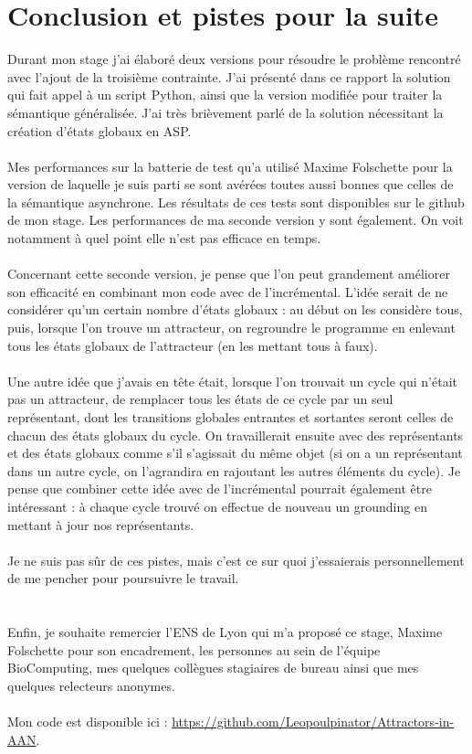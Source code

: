 \documentclass[10pt,a4paper]{article}
\begin{document}
\section{Conclusion et pistes pour la suite}
Durant mon stage j'ai élaboré deux versions pour résoudre le problème rencontré avec l'ajout de la troisième contrainte. J'ai présenté dans ce rapport la solution qui fait appel à un script Python, ainsi que la version modifiée 
pour traiter la sémantique généralisée. J'ai très brièvement parlé de la solution nécessitant la création d'états globaux en ASP.\\ \\
Mes performances sur la batterie de test qu'a utilisé Maxime Folschette pour la version de laquelle je suis parti se sont avérées toutes aussi bonnes que celles de la sémantique asynchrone. Les résultats de ces tests sont 
disponibles sur le github de mon stage. Les performances de ma seconde version y sont également. On voit notamment à quel point 
elle n'est pas efficace en temps.\\ \\
Concernant cette seconde version, je pense que l'on peut grandement améliorer son efficacité en combinant mon code avec de l'incrémental. L'idée serait de ne considérer qu'un certain nombre d'états globaux : au début on les 
considère tous, puis, lorsque l'on trouve un attracteur, on regroundre le programme en enlevant tous les états globaux de l'attracteur (en les mettant tous à faux).\\ \\
Une autre idée que j'avais en tête était, lorsque l'on trouvait un cycle qui n'était pas un attracteur, de remplacer tous les états de ce cycle par un seul représentant, dont les transitions globales entrantes et sortantes 
seront celles de chacun des états globaux du cycle. On travaillerait ensuite avec des représentants et des états globaux comme s'il s'agissait du même objet (si on a un représentant dans un autre cycle, on l'agrandira en rajoutant 
les autres éléments du cycle). Je pense que combiner cette idée avec de l'incrémental pourrait également être intéressant : à chaque cycle trouvé on effectue de nouveau un grounding en mettant à jour nos représentants.\\ \\
Je ne suis pas sûr de ces pistes, mais c'est ce sur quoi j'essaierais personnellement de me pencher pour poursuivre le travail.\\ \\ \\
Enfin, je souhaite remercier l'ENS de Lyon qui m'a proposé ce stage, Maxime Folschette pour son encadrement, les personnes au sein de l'équipe BioComputing, mes quelques collègues stagiaires de bureau ainsi que mes quelques 
relecteurs anonymes.\\ \\
Mon code est disponible ici : \href{https://github.com/Leopoulpinator/Attractors-in-AAN}{https://github.com/Leopoulpinator/Attractors-in-AAN}.
\end{document}
